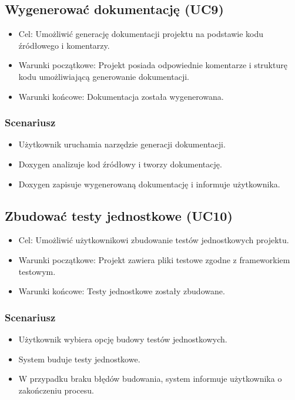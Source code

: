 \subsection{Wygenerować dokumentację (UC9)}
\begin{itemize}
    \item Cel: Umożliwić generację dokumentacji projektu na podstawie kodu źródłowego i komentarzy.
    \item Warunki początkowe: Projekt posiada odpowiednie komentarze i strukturę kodu umożliwiającą generowanie dokumentacji.
    \item Warunki końcowe: Dokumentacja została wygenerowana.
\end{itemize}

\subsubsection{Scenariusz}
\begin{itemize}
    \item Użytkownik uruchamia narzędzie generacji dokumentacji.
    \item Doxygen analizuje kod źródłowy i tworzy dokumentację.
    \item Doxygen zapisuje wygenerowaną dokumentację i informuje użytkownika.
\end{itemize}

\subsection{Zbudować testy jednostkowe (UC10)}
\begin{itemize}
    \item Cel: Umożliwić użytkownikowi zbudowanie testów jednostkowych projektu.
    \item Warunki początkowe: Projekt zawiera pliki testowe zgodne z frameworkiem testowym.
    \item Warunki końcowe: Testy jednostkowe zostały zbudowane.
\end{itemize}

\subsubsection{Scenariusz}
\begin{itemize}
    \item Użytkownik wybiera opcję budowy testów jednostkowych.
    \item System buduje testy jednostkowe.
    \item W przypadku braku błędów budowania, system informuje użytkownika o zakończeniu procesu.
\end{itemize}

